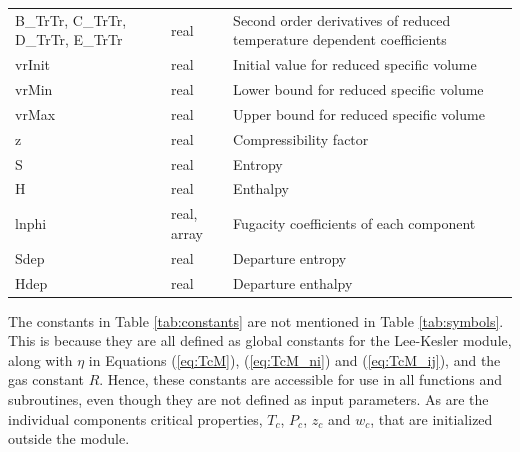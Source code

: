 \documentclass[internal,english]{sintefmemo2012}
\numberwithin{equation}{section}
\newcommand*{\reff}[1]{(\ref{#1})}
\begin{document}
\begin{table}[h!]
\begin{center}
\begin{tabular}{p{2.8cm} l p{8cm}}
B\_TrTr, C\_TrTr, D\_TrTr, E\_TrTr & real	& Second order derivatives of reduced temperature dependent coefficients \\
vrInit	& real		& Initial value for reduced specific volume \\
vrMin	& real		& Lower bound for reduced specific volume \\
vrMax	& real		& Upper bound for reduced specific volume \\
z		& real		& Compressibility factor \\
S		& real		& Entropy \\
H		& real		& Enthalpy \\
lnphi	& real, array & Fugacity coefficients of each component \\
Sdep 	& real		& Departure entropy \\
Hdep	& real		& Departure enthalpy \\
\hline
\end{tabular}
\end{center}
\end{table}

The constants in Table \ref{tab:constants} are not mentioned in Table \ref{tab:symbols}. This is because they are all defined as global constants for the Lee-Kesler module, along with $\eta$ in Equations \reff{eq:TcM}, \reff{eq:TcM_ni} and \reff{eq:TcM_ij}, and the gas constant $R$. Hence, these constants are accessible for use in all functions and subroutines, even though they are not defined as input parameters. As are the individual components critical properties, $T_c$, $P_c$, $z_c$ and $w_c$, that are initialized outside the module.
\end{document}
